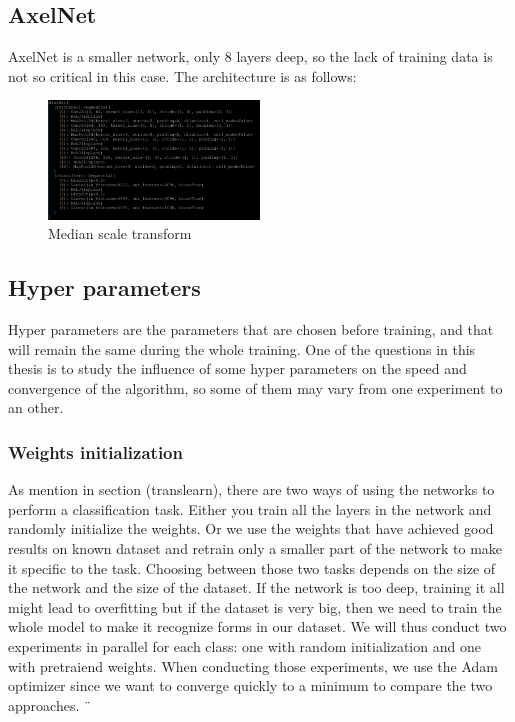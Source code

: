 \subsection{AxelNet}
AxelNet is a smaller network, only 8 layers deep, so the lack of training data is not so critical in this case. The architecture is as follows: 
 \begin{figure}[h]
    \centering
        \includegraphics[width=0.5\textwidth]{./figures/03-alexnet_architecture}
        \caption{Median scale transform}\label{fig:alex}
\end{figure}

\subsection{Hyper parameters}
Hyper parameters are the parameters that are chosen before training, and that will remain the same during the whole training. One of the questions in this thesis is to study the influence of some hyper parameters on the speed and convergence of the algorithm, so some of them may vary from one experiment to an other. 

\subsubsection{Weights initialization}
As mention in section (translearn), there are two ways of using the networks to perform a classification task. Either you train all the layers in the network and randomly initialize the weights. Or we use the weights that have achieved good results on known dataset and retrain only a smaller part of the network to make it specific to the task.
Choosing between those two tasks depends on the size of the network and the size of the dataset. If the network is too deep, training it all might lead to overfitting but if the dataset is very big, then we need to train the whole model to make it recognize forms in our dataset. 
We will thus conduct two experiments in parallel for each class: one with random initialization and one with pretraiend weights. 
When conducting those experiments, we use the Adam optimizer since we want to converge quickly to a minimum to compare the two approaches. ¨

